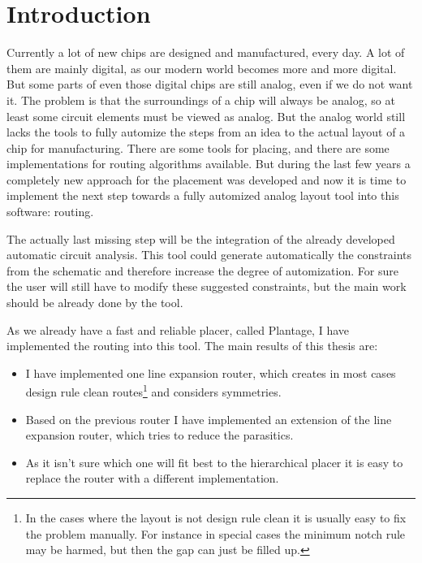 \chapter{Introduction}

Currently a lot of new chips are designed and manufactured, every day. A lot of them are mainly digital, as our modern world becomes more and more digital. But some parts of even those digital chips are still analog, even if we do not want it. The problem is that the surroundings of a chip will always be analog, so at least some circuit elements must be viewed as analog. But the analog world still lacks the tools to fully automize the steps from an idea to the actual layout of a chip for manufacturing. There are some tools for placing, and there are some implementations for routing algorithms available. But during the last few years a completely new approach for the placement was developed and now it is time to implement the next step towards a fully automized analog layout tool into this software: routing.

The actually last missing step will be the integration of the already developed automatic circuit analysis. This tool could generate automatically the constraints from the schematic and therefore increase the degree of automization. For sure the user will still have to modify these suggested constraints, but the main work should be already done by the tool.

As we already have a fast and reliable placer, called Plantage, I have implemented the routing into this tool. The main results of this thesis are:
\begin{itemize}
\item I have implemented one line expansion router, which creates in most cases design rule clean routes\footnote{\label{foot:1}In the cases where the layout is not design rule clean it is usually easy to fix the problem manually. For instance in special cases the minimum notch rule may be harmed, but then the gap can just be filled up.} and considers symmetries.
\item Based on the previous router I have implemented an extension of the line expansion router, which tries to reduce the parasitics.
\item As it isn't sure which one will fit best to the hierarchical placer it is easy to replace the router with a different implementation.
\end{itemize}